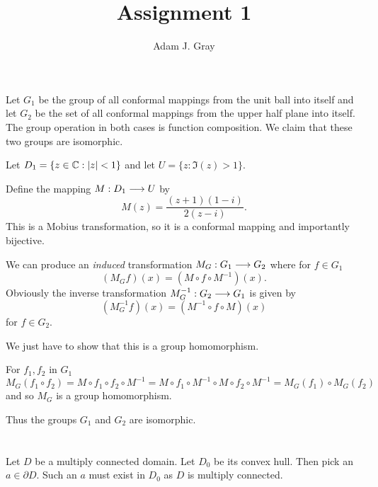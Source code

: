 \documentclass{unswmaths}
\begin{document}
\author{Adam J. Gray}
\title{Assignment 1}
\subject{Complex Analysis}

\newcommand{\llra}{\Leftrightarrow}

\unswtitle

\section{}
\section{}
\section{}

Let $ G_1 $ be the group of all conformal mappings from the unit ball into itself and let $ G_2 $ be the set of all conformal mappings from the upper half plane into itself. The group operation in both cases is function composition.  We claim that these two groups are isomorphic. 

Let $ D_1 = \{ z \in \mathbb{C} : |z| < 1 \} $ and let $ U = \{ z : \Im(z) > 1 \} $.

Define the mapping $ M : D_1 \longrightarrow U $ by
$$ M(z) = \frac{(z+1)(1-i)}{2(z-i)}.$$
This is a Mobius transformation, so it is a conformal mapping and importantly bijective. 

We can produce an \emph{induced} transformation $ M_G : G_1 \longrightarrow G_2 $ where for $ f \in G_1 $
$$
	(M_G f)(x) = (M \circ f \circ M^{-1})(x).
$$
Obviously the inverse transformation $ M^{-1}_G : G_2 \longrightarrow G_1 $ is given by 
$$
	(M^{-1}_G f)(x) = (M^{-1} \circ f \circ M)(x) 
$$
for $ f \in G_2 $.

We just have to show that this is a group homomorphism.  

For $ f_1, f_2 $ in $ G_1 $
$$ M_G(f_1 \circ f_2) = M\circ f_1 \circ f_2 \circ M^{-1} = M\circ f_1 \circ M^{-1} \circ M \circ f_2 \circ M^{-1} = M_G(f_1) \circ M_G(f_2) $$
and so $ M_G $ is a group homomorphism. 

Thus the groups $ G_1 $ and $ G_2 $ are isomorphic. 

\section{}
Let $ D $ be a multiply connected domain. Let $ D_0 $ be its convex hull. Then pick an $ a \in \partial D $. Such an $ a $ must exist in $ D_0 $ as $ D $ is multiply connected.
\end{document}
